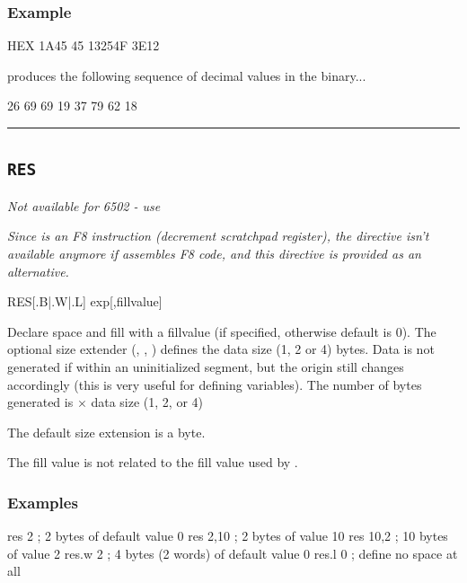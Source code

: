 \subsubsection{Example}
\begin{code}
 HEX 1A45 45 13254F 3E12
\end{code}

produces the following sequence of decimal values in the binary...

\begin{outputx}
26 69 69 19 37 79 62 18
\end{outputx}
	
\hrule
	
	
\subsection{\texttt{RES}}
\label{changelog:20200906res}
\label{pseudoop:res}	
	
\emph{Not available for 6502 - use }
	
\emph{Since  is an F8 instruction (decrement scratchpad register),
the  directive isn't available anymore if \dasm assembles
F8 code, and this  directive is provided as an alternative.
}


\begin{usage}
  RES[{.B|.W|.L}] exp[,fillvalue]
\end{usage}

Declare space and fill with a fillvalue (if specified, otherwise default is 0). The optional size extender (, , ) defines the data size (1, 2 or 4) bytes. Data is not generated if within an uninitialized segment, but the origin still changes accordingly (this is very useful for defining variables). The number of bytes generated is  $\times$ data size (1, 2, or 4)

The default size extension is a byte.

The fill value is not related to the fill value used by .


\subsubsection{Examples}

\begin{code}[caption=Declaring Space]
 res 2     ; 2 bytes of default value 0
 res 2,10  ; 2 bytes of value 10
 res 10,2  ; 10 bytes of value 2
 res.w 2   ; 4 bytes (2 words) of default value 0
 res.l 0   ; define no space at all
 \end{code}

